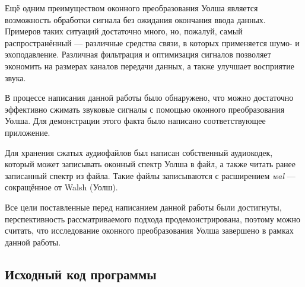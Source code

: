\documentclass{matmex-diploma-custom}
\begin{document}
Ещё одним преимуществом оконного преобразования Уолша является 
возможность обработки сигнала без ожидания окончания ввода данных.
Примеров таких ситуаций достаточно много, но, пожалуй, самый
распространённый --- различные средства связи, в которых применяется
шумо- и эхоподавление. Различная фильтрация и оптимизация сигналов
позволяет экономить на размерах каналов передачи данных, а также улучшает
восприятие звука.

В процессе написания данной работы было обнаружено, что можно достаточно 
эффективно сжимать звуковые сигналы с помощью оконного преобразования Уолша.
Для демонстрации этого факта было написано соответствующее приложение.

Для хранения сжатых аудиофайлов был написан собственный аудиокодек,
который может записывать оконный спектр Уолша в файл, а также
читать ранее записанный спектр из файла. Такие файлы записываются
с расширением \emph{wal} --- сокращённое от Walsh (Уолш).

Все цели поставленные перед написанием данной работы были достигнуты,
перспективность рассматриваемого подхода продемонстрирована, поэтому
можно считать, что исследование оконного преобразования Уолша завершено 
в рамках данной работы.




\nocite{*}


\begin{appendices}
\section{Исходный код программы}
    
    
    
    
    
    
\end{appendices}
\end{document}
